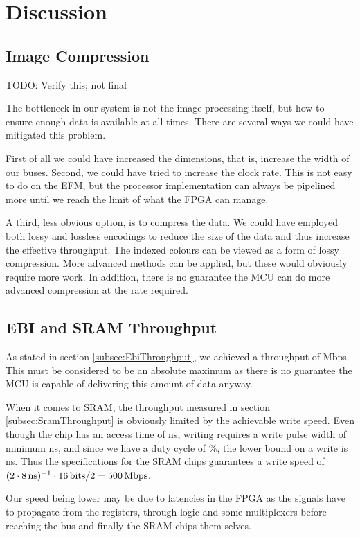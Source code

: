 \section{Discussion}

\subsection{Image Compression}
TODO: Verify this; not final

The bottleneck in our system is not the image processing itself, but how to ensure enough data is available at all times.
There are several ways we could have mitigated this problem.

First of all we could have increased the dimensions, that is, increase the width of our buses. Second, we could have tried to increase the clock rate. This is not easy to do on the EFM, but the processor implementation can always be pipelined more until we reach the limit of what the FPGA can manage.

A third, less obvious option, is to compress the data. We could have employed both lossy and lossless encodings to reduce the size of the data and thus increase the effective throughput. The indexed colours can be viewed as a form of lossy compression.
More advanced methods can be applied, but these would obviously require more work.
In addition, there is no guarantee the MCU can do more advanced compression at the rate required.

\subsection{EBI and SRAM Throughput}
As stated in section \ref{subsec:EbiThroughput}, we achieved a throughput of \unit[384]{Mbps}.
This must be considered to be an absolute maximum as there is no guarantee the MCU is capable of delivering this amount of data anyway.

When it comes to SRAM, the throughput measured in section \ref{subsec:SramThroughput} is obviously limited by the achievable write speed.
Even though the chip has an access time of \unit[10]{ns}, writing requires a write pulse width of minimum \unit[8]{ns}, and since we have a duty cycle of \unit[50]{\%}, the lower bound on a write is \unit[16]{ns}.
Thus the specifications for the SRAM chips guarantees a write speed of $(2\cdot\unit[8]{ns})^{-1} \cdot \unit[16]{bits} / 2 = \unit[500]{Mbps}$.

Our speed being lower may be due to latencies in the FPGA as the signals have to propagate from the registers, through logic and some multiplexers before reaching the bus and finally the SRAM chips them selves.
